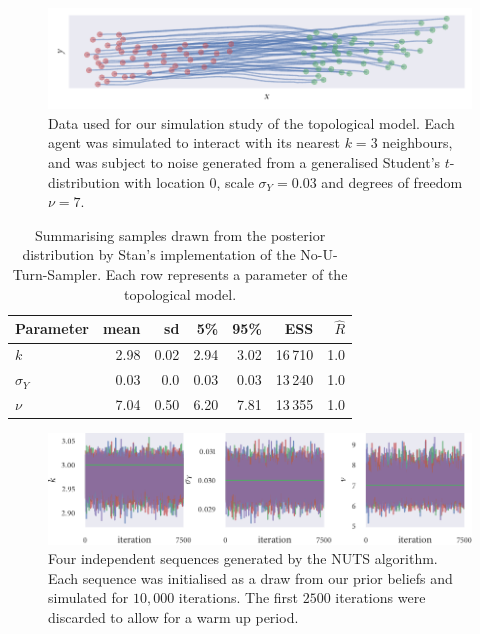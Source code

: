 \begin{figure}[tbp]
  \includegraphics{top_sim.pdf}
  \caption{Data used for our simulation study of the topological model. Each agent was
    simulated to interact with its nearest $k=3$ neighbours, and was subject to noise
    generated from a generalised Student's $t$-distribution with location $0$, scale
    $\sigma_Y=0.03$ and degrees of freedom $\nu=7$.}
  \label{fig:top_sim}
\end{figure}
\begin{table}[tbp]
  \begin{tabular}{@{}lrrrrrr@{}}
    \toprule
    Parameter    & mean & sd   & 5\%  & 95\% & ESS     & $\widehat{R}$ \\
    \midrule
    $k$          & 2.98 & 0.02 & 2.94 & 3.02 & 16\,710 & 1.0           \\
    $\sigma_{Y}$ & 0.03 & 0.0  & 0.03 & 0.03 & 13\,240 & 1.0           \\
    $\nu$        & 7.04 & 0.50 & 6.20 & 7.81 & 13\,355 & 1.0           \\
    \bottomrule
  \end{tabular}
  \caption{Summarising samples drawn from the posterior distribution by Stan's
    implementation of the No-U-Turn-Sampler. Each row represents a parameter of the
    topological model.}
  \label{tab:top_summary}
\end{table}
\begin{figure}[tbp]
  \includegraphics{top_trace.pdf}
  \caption{Four independent sequences generated by the NUTS algorithm. Each sequence was
    initialised as a draw from our prior beliefs and simulated for $10,000$ iterations.
    The first $2500$ iterations were discarded to allow for a warm up period.}
    \label{fig:top_trace}
\end{figure}

